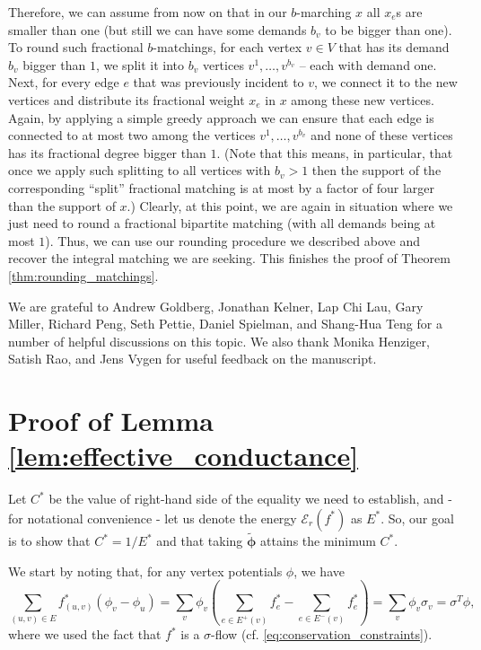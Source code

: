 \documentclass[11pt, letterpaper]{article}
\newcommand{\energy}[2]{\mathcal{E}_{#1}(#2)}
\newcommand{\vphi}{\boldsymbol{\mathit{\phi}}}
\newcommand{\vsigma}{\boldsymbol{\mathit{\sigma}}}
\newcommand{\tvphi}{\boldsymbol{\tilde{\phi}}}
\newcommand{\bb}{\boldsymbol{\mathit{b}}}
\newcommand{\ff}{\boldsymbol{\mathit{f}}}
\newcommand{\rr}{\boldsymbol{\mathit{r}}}
\newcommand{\xx}{\boldsymbol{\mathit{x}}}
\begin{document}
Therefore, we can assume from now on that in our $\bb$-marching $\xx$ all $x_e$s are smaller than one (but still we can have some demands $b_v$ to be bigger than one). To round such fractional $\bb$-matchings, for each vertex $v\in V$ that has its demand $b_v$ bigger than $1$, we split it into $b_v$ vertices $v^{1},\ldots, v^{b_v}$ -- each with demand one. Next, for every edge $e$ that was previously incident to $v$, we connect it to the new vertices and distribute its fractional weight $x_e$ in $\xx$ among these new vertices. Again, by applying a simple greedy approach we can ensure that each edge is connected to at most two among the vertices $v^{1},\ldots, v^{b_v}$ and none of these vertices has its fractional degree bigger than $1$. (Note that this means, in particular, that once we apply such splitting to all vertices with $b_v>1$ then the support of the corresponding ``split'' fractional matching is at most by a factor of four larger than the support of $\xx$.) Clearly, at this point, we are again in situation where we just need to round a fractional bipartite matching (with all demands being at most $1$). Thus, we can use our rounding procedure we described above and recover the integral matching we are seeking. This finishes the proof of Theorem \ref{thm:rounding_matchings}.
 \vspace{10pt}

 We are grateful to Andrew Goldberg, Jonathan Kelner, Lap Chi Lau, Gary Miller, Richard Peng, Seth Pettie, Daniel Spielman, and Shang-Hua Teng for a number of helpful discussions on this topic. We also thank Monika Henziger, Satish Rao, and Jens Vygen for useful feedback on the manuscript.  

\appendix
\section{Proof of Lemma \ref{lem:effective_conductance}}\label{app:effective_conductance}
Let $C^*$ be the value of right-hand side of the equality we need to establish, and - for notational convenience - let us denote the energy $\energy{\rr}{\ff^*}$ as $E^*$. So, our goal is to show that $C^*=1/E^*$ and that taking $\tvphi$ attains the minimum $C^*$.

We start by noting that, for any vertex potentials $\vphi$, we have
\begin{equation}\label{eq:conductance_proof_identity}
\sum_{(u,v)\in E} f^*_{(u,v)} (\phi_v-\phi_u)=\sum_{v} \phi_v (\sum_{e\in E^+(v)} f_{e}^* - \sum_{e\in E^-(v)} f_{e}^*)=\sum_v \phi_v \sigma_v = \vsigma^T \vphi,
\end{equation}
where we used the fact that $\ff^*$ is a $\vsigma$-flow (cf. \eqref{eq:conservation_constraints}).
\end{document}
